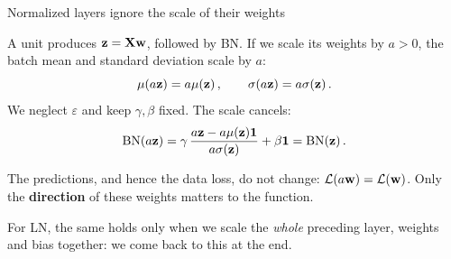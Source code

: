 \documentclass[11pt,aspectratio=169]{beamer}
\begin{document}
\begin{frame}{Normalized layers ignore the scale of their weights}
    \small
    \setlength{\parskip}{5pt}
    \setlength{\abovedisplayskip}{5pt}\setlength{\belowdisplayskip}{5pt}

    A unit produces $\boldsymbol{\mathbf{z}}=\boldsymbol{\mathbf{X}}\boldsymbol{\mathbf{w}}$, followed by BN. If we scale its
    weights by $a>0$, the batch mean and standard deviation scale by $a$:
    \[
        \mu(a\boldsymbol{\mathbf{z}})=a\mu(\boldsymbol{\mathbf{z}}) \,, \qquad
        \sigma(a\boldsymbol{\mathbf{z}})=a\sigma(\boldsymbol{\mathbf{z}}) \,.
    \]
    We neglect $\varepsilon$ and keep $\gamma,\beta$ fixed. The scale cancels:
    \[
        \text{BN}(a\boldsymbol{\mathbf{z}})
        = \gamma\,\frac{a\boldsymbol{\mathbf{z}}-a\mu(\boldsymbol{\mathbf{z}})\boldsymbol{\mathbf{1}}}{a\sigma(\boldsymbol{\mathbf{z}})}
          +\beta\boldsymbol{\mathbf{1}}
        = \text{BN}(\boldsymbol{\mathbf{z}}) \,.
    \]

    \begin{tcolorbox}[nndsblue]
        The predictions, and hence the data loss, do not change:
        $\mathcal{L}(a\boldsymbol{\mathbf{w}})=\mathcal{L}(\boldsymbol{\mathbf{w}})$.
        Only the \textbf{direction} of these weights matters to the function.
    \end{tcolorbox}

    For LN, the same holds only when we scale the \emph{whole} preceding
    layer, weights and bias together: we come back to this at the end.


\end{frame}
\end{document}
